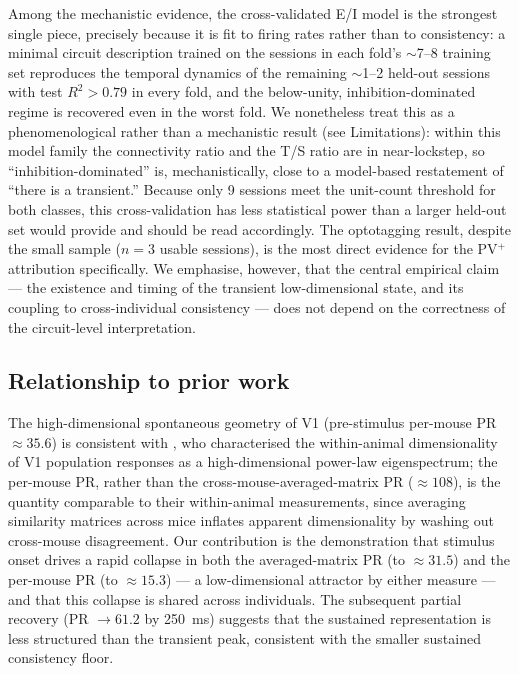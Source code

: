 \documentclass[11pt,onecolumn]{article}
\begin{document}
Among the mechanistic evidence, the cross-validated E/I model is the
strongest single piece, precisely because it is fit to firing rates
rather than to consistency: a minimal circuit description trained on the
sessions in each fold's $\sim$7--8 training set reproduces the temporal
dynamics of the remaining $\sim$1--2 held-out sessions with test
$R^2 > 0.79$ in every fold, and the below-unity, inhibition-dominated
regime is recovered even in the worst fold.  We nonetheless treat this as
a phenomenological rather than a mechanistic result (see Limitations):
within this model family the connectivity ratio and the T/S ratio are in
near-lockstep, so ``inhibition-dominated'' is, mechanistically, close to a
model-based restatement of ``there is a transient.''  Because only 9
sessions meet the unit-count threshold for both classes, this
cross-validation has less statistical power than a larger held-out set
would provide and should be read accordingly.  The optotagging result, despite the
small sample ($n = 3$ usable sessions), is the most direct evidence for
the PV$^+$ attribution specifically.  We emphasise, however, that the
central empirical claim --- the existence and timing of the transient
low-dimensional state, and its coupling to cross-individual consistency
--- does not depend on the correctness of the circuit-level
interpretation.

\subsection{Relationship to prior work}

The high-dimensional spontaneous geometry of V1 (pre-stimulus per-mouse
PR~$\approx 35.6$) is consistent with \citet{stringer2019}, who
characterised the within-animal dimensionality of V1 population
responses as a high-dimensional power-law eigenspectrum; the per-mouse
PR, rather than the cross-mouse-averaged-matrix PR ($\approx 108$), is
the quantity comparable to their within-animal measurements, since
averaging similarity matrices across mice inflates apparent
dimensionality by washing out cross-mouse disagreement.  Our contribution
is the demonstration that stimulus onset drives a rapid collapse in both
the averaged-matrix PR (to $\approx 31.5$) and the per-mouse PR (to
$\approx 15.3$) --- a low-dimensional attractor by either measure --- and
that this collapse is shared across individuals.  The
subsequent partial recovery (PR $\to 61.2$ by 250~ms) suggests that the
sustained representation is less structured than the transient peak,
consistent with the smaller sustained consistency floor.
\end{document}

